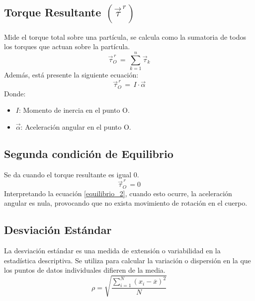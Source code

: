 \documentclass[../main.tex]{subfiles}
\begin{document}
\subsection{Torque Resultante $(\vec{\tau}^{\,r})$}
Mide el torque total sobre una partícula, se calcula como la 
sumatoria de todos los torques que actuan sobre la partícula.
\begin{equation} \label{torque_resultante1}
    \vec{\tau}_O^{\,r} \, = \, \sum^n_{k=1} \vec{\tau}_k
\end{equation}
Además, está presente la siguiente ecuación:
\begin{equation} \label{torque_resultante2}
    \vec{\tau}_O^{\,r} \, = \, I \cdot  \vec{\alpha}
\end{equation}
Donde:
\begin{itemize}
    \item $I$: Momento de inercia en el punto O.
    \item $\vec{\alpha}$: Aceleración angular en el punto O.
\end{itemize}

\subsection{Segunda condición de Equilibrio}
Se da cuando el torque resultante es igual 0.
\begin{equation} \label{equilibrio_2}
    \vec{\tau}_O^{\,r} \, = 0
\end{equation}
Interpretando la ecuación \ref{equilibrio_2}, cuando esto ocurre, la aceleración 
angular es nula, provocando que no exista movimiento de rotación en el cuerpo.


\subsection{Desviación Estándar}
La desviación estándar es una medida de extensión o 
variabilidad en la estadística descriptiva. 
Se utiliza para calcular la variación o dispersión
en la que los puntos de datos individuales difieren 
de la media. 
\begin{equation} \label{desviacion_eq}
    \rho = \sqrt{\frac{\sum^N_{i=1} (x_i - \overline{x})^2}{N}}
\end{equation}
\end{document}
